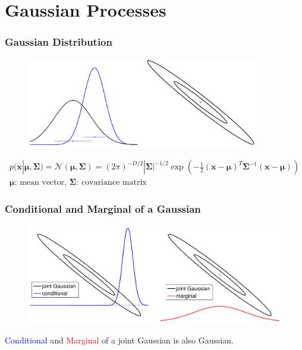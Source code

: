 \documentclass[10pt]{beamer}
\newcommand{\bx}{\mathbf{x}}
\newcommand{\gaussN}{\mathcal{N}}
\newcommand{\bmu}{\boldsymbol{\mu}}
\newcommand{\bSig}{\boldsymbol{\Sigma}}
\begin{document}
  \section{Gaussian Processes}
  \begin{frame}
    \frametitle{Gaussian Distribution}

    \begin{figure}
      \centering
      \includegraphics[width=0.9\textwidth]{gaussDist1.png}
    \end{figure}

    \begin{equation*}
      \begin{array}{c}
        p(\bx|\bmu,\bSig) = \gaussN(\bmu,\bSig) = (2\pi)^{-D/2} |\bSig|^{-1/2} \exp \left( - \frac{1}{2} (\bx - \bmu)^T \bSig^{-1} (\bx - \bmu) \right) \\
        \bmu \text{: mean vector, } \bSig \text{: covariance matrix}
      \end{array}
    \end{equation*}
  \end{frame}

  \begin{frame}
    \frametitle{Conditional and Marginal of a Gaussian}

    \begin{figure}
      \centering
      \includegraphics[width=\textwidth]{gaussDist2.png}
    \end{figure}

    \begin{center}
      \textcolor{blue}{Conditional} and \textcolor{red}{Marginal} of a joint Gaussian is also Gaussian.
    \end{center}

  \end{frame}
\end{document}
